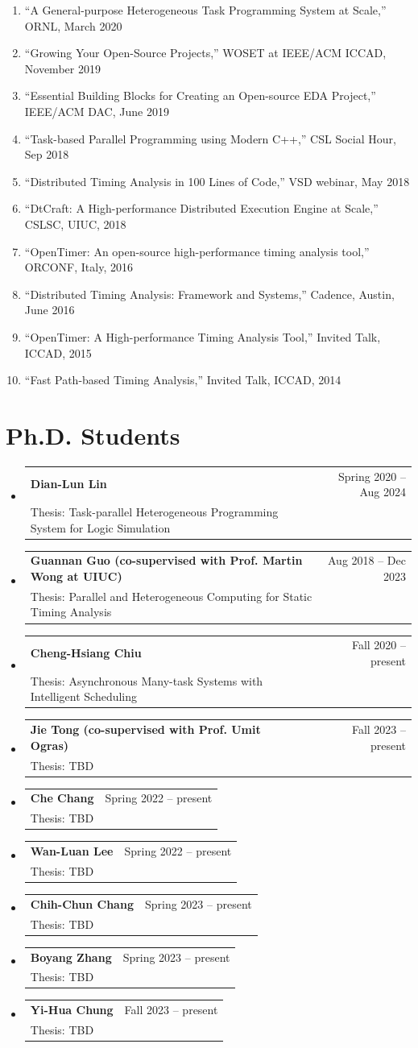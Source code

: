 \documentclass[A4,11pt]{article}
\makeatletter
\newcommand{\CVSubheading}[4]{
  \vspace{-2pt}\item
    \begin{tabular*}{0.97\textwidth}[t]{l@{\extracolsep{\fill}}r}
      \textbf{#1} & #2 \\
      \small#3 & \small #4 \\
    \end{tabular*}\vspace{-7pt}
}
\newcommand{\CVSubHeadingListStart}{\begin{itemize}[leftmargin=0.5cm, label={}]}
\newcommand{\CVSubHeadingListEnd}{\end{itemize}}
\makeatother
\begin{document}
\begin{enumerate}
  \item ``A General-purpose Heterogeneous Task Programming System at Scale,'' ORNL, March 2020
  \item ``Growing Your Open-Source Projects,'' WOSET at IEEE/ACM ICCAD, November 2019
  \item ``Essential Building Blocks for Creating an Open-source EDA Project,'' IEEE/ACM DAC, June 2019
  \item ``Task-based Parallel Programming using Modern C++,'' CSL Social Hour, Sep 2018
  \item ``Distributed Timing Analysis in 100 Lines of Code,'' VSD webinar, May 2018
  \item ``DtCraft: A High-performance Distributed Execution Engine at Scale,'' CSLSC, UIUC, 2018
  \item ``OpenTimer: An open-source high-performance timing analysis tool,'' ORCONF, Italy, 2016
  \item ``Distributed Timing Analysis: Framework and Systems,'' Cadence, Austin, June 2016
  \item ``OpenTimer: A High-performance Timing Analysis Tool,'' Invited Talk, ICCAD, 2015
  \item ``Fast Path-based Timing Analysis,'' Invited Talk, ICCAD, 2014

 \end{enumerate}

\section{Ph.D. Students}
  \CVSubHeadingListStart
    \CVSubheading
      {{Dian-Lun Lin}}{Spring 2020 -- Aug 2024}
      {Thesis: Task-parallel Heterogeneous Programming System for Logic Simulation}{}
    \CVSubheading
      {{Guannan Guo (co-supervised with Prof. Martin Wong at UIUC)}}{Aug 2018 -- Dec 2023}
      {Thesis: Parallel and Heterogeneous Computing for Static Timing Analysis}{}
    \CVSubheading
      {{Cheng-Hsiang Chiu}}{Fall 2020 -- present}
      {Thesis: Asynchronous Many-task Systems with Intelligent Scheduling}{}
    \CVSubheading
      {{Jie Tong (co-supervised with Prof. Umit Ogras)}}{Fall 2023 -- present}
      {Thesis: TBD}{}
    \CVSubheading
      {{Che Chang}}{Spring 2022 -- present}
      {Thesis: TBD}{}
    \CVSubheading
      {{Wan-Luan Lee}}{Spring 2022 -- present}
      {Thesis: TBD}{}
    \CVSubheading
      {{Chih-Chun Chang}}{Spring 2023 -- present}
      {Thesis: TBD}{}
    \CVSubheading
      {{Boyang Zhang}}{Spring 2023 -- present}
      {Thesis: TBD}{}
    \CVSubheading
      {{Yi-Hua Chung}}{Fall 2023 -- present}
      {Thesis: TBD}{}
  \CVSubHeadingListEnd
\end{document}
